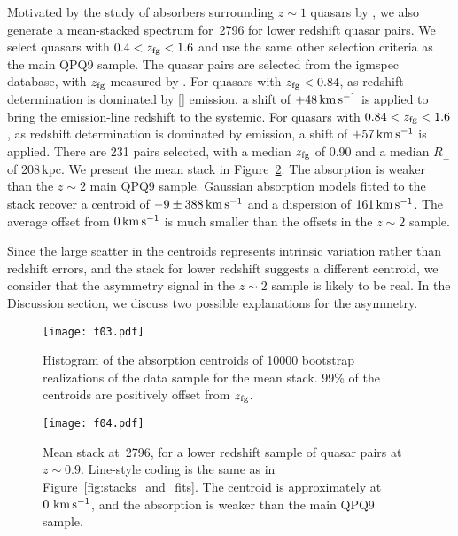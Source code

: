\documentclass[iop]{emulateapj}
\begin{document}
Motivated by the study of  absorbers surrounding $z\sim1$ quasars by \cite{Johnson+15}, 
we also generate a mean-stacked spectrum for \,2796 for lower redshift quasar pairs.  
We select quasars with $0.4<z_{\rm fg}<1.6$ and use the same other selection criteria as the main 
QPQ9 sample. The quasar pairs are selected from the igmspec database, with $z_{\rm fg}$ measured 
by \cite{HewettWild10}. For quasars with $z_{\rm fg}<0.84$, as redshift determination is dominated 
by [] emission, a shift of $+48\,{\rm km\,s^{-1}}$ is applied to bring the emission-line 
redshift to the systemic. For quasars with $0.84<z_{\rm fg}<1.6$, as redshift determination is 
dominated by  emission, a shift of $+57\,{\rm km\,s^{-1}}$ is applied. There are 231 
pairs selected, with a median $z_{\rm fg}$ of 0.90 and a median $R_\perp$ of 208\,kpc. We present 
the mean stack in Figure~\ref{fig:stack_z1}. The absorption is weaker than the $z\sim2$ main QPQ9 
sample. Gaussian absorption models fitted to the stack recover a centroid of 
$-9\pm388\,{\rm km\,s^{-1}}$ and a dispersion of $161\,{\rm km\,s^{-1}}$. The average offset 
from $0\,{\rm km\,s^{-1}}$ is much smaller than the offsets in the $z\sim2$ sample. 

Since the large scatter in the centroids represents intrinsic variation rather than redshift 
errors, and the  stack for lower redshift suggests a different centroid, we 
consider that the asymmetry signal in the $z\sim2$ sample is likely to be real. In the Discussion 
section, we discuss two possible explanations for the asymmetry. 

\begin{figure}
\texttt{[image: f03.pdf]}
\caption{Histogram of the absorption centroids of 10000 bootstrap realizations of the data sample 
for the  mean stack. 99\% of the centroids are positively offset from $z_{\rm fg}$.}
\label{fig:histogram_cen}
\end{figure}

\begin{figure}
\texttt{[image: f04.pdf]}
\caption{Mean stack at \,2796, for a lower redshift sample of quasar pairs at 
$z\sim0.9$. Line-style coding is the same as in Figure~\ref{fig:stacks_and_fits}. The centroid is 
approximately at $0\,{\rm \,km\,s^{-1}}$, and the absorption is weaker than the main QPQ9 sample. 
}
\label{fig:stack_z1}
\end{figure}
\end{document}
